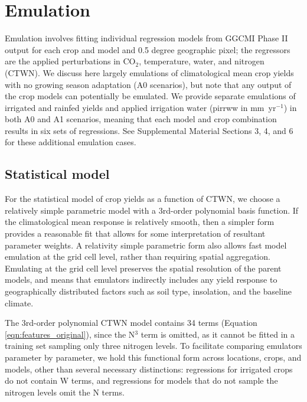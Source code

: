 \documentclass[gmdd]{copernicus} %
\begin{document}
\section{Emulation}
\label{S:3}
Emulation involves fitting individual regression models from GGCMI Phase II output for each crop and model and 0.5 degree geographic pixel; the regressors are the applied perturbations in CO$_2$, temperature, water, and nitrogen (CTWN). 
We discuss here largely emulations of climatological mean crop yields with no growing season adaptation (A0 scenarios), but note that any output of the crop models can potentially be emulated. 
We provide separate emulations of irrigated and rainfed yields and applied irrigation water (pirrww in mm\ yr$^{-1}$) in both A0 and A1 scenarios, meaning that each model and crop combination results in six sets of regressions. See Supplemental Material Sections 3, 4, and 6 for these additional emulation cases.

\subsection{Statistical model}
For the statistical model of crop yields as a function of CTWN, we choose a relatively simple parametric model with a 3rd-order polynomial basis function. 
If the climatological mean response is relatively smooth, then a simpler form provides a reasonable fit that allows for some interpretation of resultant parameter weights. 
A relativity simple parametric form also allows fast model emulation at the grid cell level, rather than requiring spatial aggregation. 
Emulating at the grid cell level preserves the spatial resolution of the parent models, and means that emulators indirectly includes any yield response to geographically distributed factors such as soil type, insolation, and the baseline climate.

The 3rd-order polynomial CTWN model contains 34 terms (Equation \ref{eqn:features_original}), since the N$^3$ term is omitted, as it cannot be fitted in a training set sampling only three nitrogen levels. 
To facilitate comparing emulators parameter by parameter, we hold this functional form across locations, crops, and models, other than several necessary distinctions: regressions for irrigated crops do not contain W terms, and regressions for models that do not sample the nitrogen levels omit the N terms. 
\end{document}

